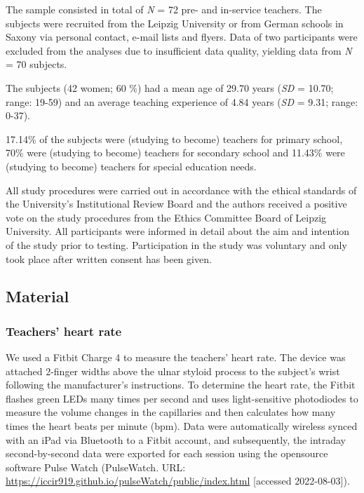 \documentclass[
  man,floatsintext]{apa6}
\begin{document}
The sample consisted in total of \emph{N} = 72 pre- and in-service teachers. The subjects were recruited from the Leipzig University or from German schools in Saxony via personal contact, e-mail lists and flyers. Data of two participants were excluded from the analyses due to insufficient data quality, yielding data from \emph{N} = 70 subjects.

The subjects (42 women; 60 \%) had a mean age of 29.70 years (\emph{SD} = 10.70; range: 19-59) and an average teaching experience of 4.84 years (\emph{SD} = 9.31; range: 0-37).

17.14\% of the subjects were (studying to become) teachers for primary school, 70\% were (studying to become) teachers for secondary school and 11.43\% were (studying to become) teachers for special education needs.

All study procedures were carried out in accordance with the ethical standards of the University's Institutional Review Board and the authors received a positive vote on the study procedures from the Ethics Committee Board of Leipzig University. All participants were informed in detail about the aim and intention of the study prior to testing. Participation in the study was voluntary and only took place after written consent has been given.

\hypertarget{material}{%
\subsection{Material}\label{material}}

\hypertarget{teachers-heart-rate}{%
\subsubsection{Teachers' heart rate}\label{teachers-heart-rate}}

We used a Fitbit Charge 4 to measure the teachers' heart rate. The device was attached 2-finger widths above the ulnar styloid process to the subject's wrist following the manufacturer's instructions. To determine the heart rate, the Fitbit flashes green LEDs many times per second and uses light-sensitive photodiodes to measure the volume changes in the capillaries and then calculates how many times the heart beats per minute (bpm). Data were automatically wireless synced with an iPad via Bluetooth to a Fitbit account, and subsequently, the intraday second-by-second data were exported for each session using the opensource software Pulse Watch (PulseWatch. URL: \url{https://iccir919.github.io/pulseWatch/public/index.html} {[}accessed 2022-08-03{]}).
\end{document}

